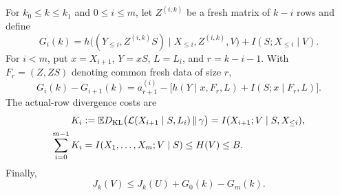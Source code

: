 \begin{lemma}\label{rhyb:hybrid}
For \(k_0\le k\le k_1\) and \(0\le i\le m\), let \(Z^{(i,k)}\) be a fresh
matrix of \(k-i\) rows and define
\[
 G_i(k)=
 h\bigl((Y_{\le i},Z^{(i,k)}S)\mid X_{\le i},Z^{(i,k)},V\bigr)
 +I(S;X_{\le i}\mid V).
\]
For \(i<m\), put \(x=X_{i+1}\), \(Y=xS\), \(L=L_i\), and \(r=k-i-1\).
With \(F_r=(Z,ZS)\) denoting common fresh data of size \(r\),
\begin{equation}\label{rhyb:hybrid-step}
 G_i(k)-G_{i+1}(k)
 =a_{r+1}^{(i)}
 -\bigl[h(Y\mid x,F_r,L)+I(S;x\mid F_r,L)\bigr].
\end{equation}
The actual-row divergence costs are
\begin{align}
 K_i&:=\mathbb E D_{\rm KL}
 \bigl(\mathcal L(X_{i+1}\mid S,L_i)\,\|\,\gamma\bigr)
 =I(X_{i+1};V\mid S,X_{\le i}),\label{rhyb:row-cost}\\
 \sum_{i=0}^{m-1}K_i
 &=I(X_1,\ldots,X_m;V\mid S)\le H(V)\le B.\label{rhyb:row-budget}
\end{align}
Finally,
\begin{equation}\label{rhyb:block-reduction}
 J_k(V)\le J_k(U)+G_0(k)-G_m(k).
\end{equation}
\end{lemma}

